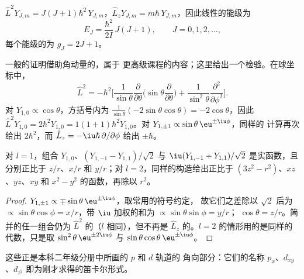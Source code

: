 \begin{theorem}[刚性转子的能级]\label{thm:b3:quantum-model-systems:rotor}
$\hat L^2Y_{J,m} = J(J+1)\hbar^2\,Y_{J,m}$，$\hat L_zY_{J,m} = m\hbar\,
Y_{J,m}$，因此线性的能级为
\[
E_J = \frac{\hbar^2}{2I}\,J(J+1), \qquad J = 0, 1, 2, \dots,
\]
每个能级的为 $g_J = 2J + 1$。
\end{theorem}
\admitted

一般的证明借助角动量的，属于
更高级课程的内容；这里给出一个检验。在球坐标中，
\[
\hat L^2 = -\hbar^2\Big[\frac{1}{\sin\theta}\frac{\partial}{\partial\theta}
\Big(\sin\theta\frac{\partial}{\partial\theta}\Big) +
\frac{1}{\sin^2\theta}\frac{\partial^2}{\partial\phi^2}\Big].
\]
对 $Y_{1,0} \propto \cos\theta$，方括号内为 $\frac{1}{\sin\theta}(-2\sin\theta
\cos\theta) = -2\cos\theta$，因此 $\hat L^2Y_{1,0} = 2\hbar^2Y_{1,0} = 1(1+1)\hbar^2
Y_{1,0}$。对 $Y_{1,\pm1} \propto \sin\theta\,\eu^{\pm\iu\phi}$，同样的
计算再次给出 $2\hbar^2$，而 $\hat L_z = -\iu\hbar\,\partial/\partial
\phi$ 给出 $\pm\hbar$。

\begin{proposition}[实球谐函数]\label{prop:b3:quantum-model-systems:real-harmonics}
对 $l = 1$，组合 $Y_{1,0}$、$(Y_{1,-1} - Y_{1,1})/\sqrt2$ 与
$\iu(Y_{1,-1} + Y_{1,1})/\sqrt2$ 是实函数，且分别正比于 $z/r$、$x/r$ 和
$y/r$；对 $l = 2$，同样的构造给出正比于
$(3z^2 - r^2)$、$xz$、$yz$、$xy$ 和 $x^2 - y^2$ 的函数，再除以 $r^2$。
\end{proposition}

\begin{proof}
$Y_{1,\pm1} \propto \mp\sin\theta\,\eu^{\pm\iu\phi}$，取常用的符号约定，
故它们之差除以 $\sqrt2$ 后为 $\propto\sin\theta\cos\phi =
x/r$，带 $\iu$ 加权的和为 $\propto\sin\theta\sin\phi = y/r$；
$\cos\theta = z/r$。简并的任一组合仍为
$\hat L^2$ 的（$l$ 相同），但不再是 $\hat
L_z$ 的。$l = 2$ 的情形用的是同样的代数，只是取 $\sin^2\theta\,\eu^{\pm2\iu\phi}$
与 $\sin\theta\cos\theta\,\eu^{\pm\iu\phi}$。
\end{proof}

这些正是本科二年级分册中所画的 $p$ 和 $d$ 轨道的
角向部分：它们的名称 $p_x$、$d_{xy}$、$d_{z^2}$
即为刚才求得的笛卡尔形式。

